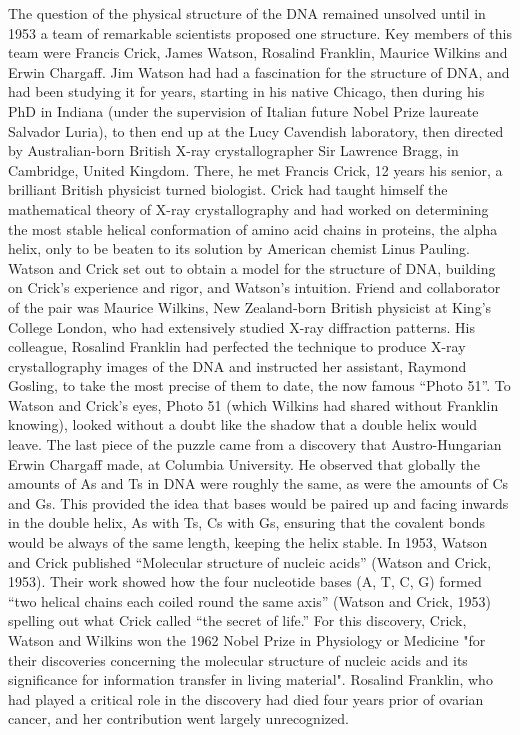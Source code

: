 The question of the physical structure of the DNA remained unsolved until in 1953 a team of remarkable scientists proposed one structure. 
Key members of this team were Francis Crick, James Watson, Rosalind Franklin, Maurice Wilkins and Erwin Chargaff. 
Jim Watson had had a fascination for the structure of DNA, and had been studying it for years, starting in his native Chicago, then during his PhD in Indiana (under the supervision of Italian future Nobel Prize laureate Salvador Luria), to then end up at the Lucy Cavendish laboratory, then directed by Australian-born British X-ray crystallographer Sir Lawrence Bragg, in Cambridge, United Kingdom. 
There, he met Francis Crick, 12 years his senior, a brilliant British physicist turned biologist. 
Crick had taught himself the mathematical theory of X-ray crystallography and had worked on determining the most stable helical conformation of amino acid chains in proteins, the alpha helix, only to be beaten to its solution by American chemist Linus Pauling. 
Watson and Crick set out to obtain a model for the structure of DNA, building on Crick’s experience and rigor, and Watson’s intuition. 
Friend and collaborator of the pair was Maurice Wilkins, New Zealand-born British physicist at King’s College London, who had extensively studied X-ray diffraction patterns. 
His colleague, Rosalind Franklin had perfected the technique to produce X-ray crystallography images of the DNA and instructed her assistant, Raymond Gosling, to take the most precise of them to date, the now famous “Photo 51”. 
To Watson and Crick’s eyes, Photo 51 (which Wilkins had shared without Franklin knowing), looked without a doubt like the shadow that a double helix would leave. 
The last piece of the puzzle came from a discovery that Austro-Hungarian Erwin Chargaff made, at Columbia University. 
He observed that globally the amounts of As and Ts in DNA were roughly the same, as were the amounts of Cs and Gs. 
This provided the idea that bases would be paired up and facing inwards in the double helix, As with Ts, Cs with Gs, ensuring that the covalent bonds would be always of the same length, keeping the helix stable. 
In 1953, Watson and Crick published “Molecular structure of nucleic acids” (Watson and Crick, 1953). 
Their work showed how the four nucleotide bases (A, T, C, G) formed “two helical chains each coiled round the same axis” (Watson and Crick, 1953) spelling out what Crick called “the secret of life.” 
For this discovery, Crick, Watson and Wilkins won the 1962 Nobel Prize in Physiology or Medicine "for their discoveries concerning the molecular structure of nucleic acids and its significance for information transfer in living material". 
Rosalind Franklin, who had played a critical role in the discovery had died four years prior of ovarian cancer, and her contribution went largely unrecognized.


